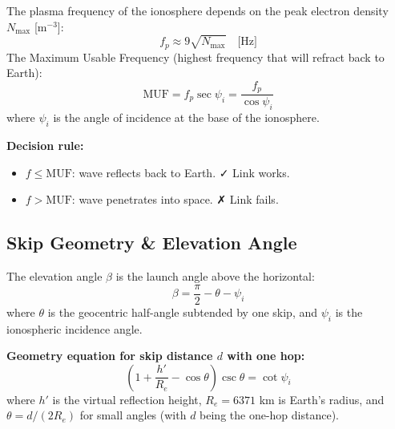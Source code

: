 \documentclass[10pt,letterpaper]{article}
\begin{document}
\begin{tcolorbox}[formulabox, title={MUF and Plasma Frequency}]
The plasma frequency of the ionosphere depends on the peak electron density $N_\mathrm{max}$ [m$^{-3}$]:
\begin{equation}
  f_p \approx 9\sqrt{N_\mathrm{max}} \quad \text{[Hz]}
\end{equation}
The Maximum Usable Frequency (highest frequency that will refract back to Earth):
\begin{equation}
  \mathrm{MUF} = f_p\sec\psi_i = \frac{f_p}{\cos\psi_i}
\end{equation}
where $\psi_i$ is the angle of incidence at the base of the ionosphere.

\textbf{Decision rule:}
\begin{itemize}[noitemsep]
  \item $f \leq \mathrm{MUF}$: wave reflects back to Earth. ✓ Link works.
  \item $f > \mathrm{MUF}$: wave penetrates into space. ✗ Link fails.
\end{itemize}
\end{tcolorbox}

\subsection{Skip Geometry \& Elevation Angle}

\begin{tcolorbox}[formulabox, title={Elevation Angle \& Skip Geometry}]
The elevation angle $\beta$ is the launch angle above the horizontal:
\begin{equation}
  \beta = \frac{\pi}{2} - \theta - \psi_i
\end{equation}
where $\theta$ is the geocentric half-angle subtended by one skip, and $\psi_i$ is the ionospheric incidence angle.

\textbf{Geometry equation for skip distance $d$ with one hop:}
\begin{equation}
  \left(1 + \frac{h'}{R_e} - \cos\theta\right)\csc\theta = \cot\psi_i
\end{equation}
where $h'$ is the virtual reflection height, $R_e = 6371$ km is Earth's radius, and $\theta = d/(2R_e)$ for small angles (with $d$ being the one-hop distance).
\end{tcolorbox}
\end{document}

